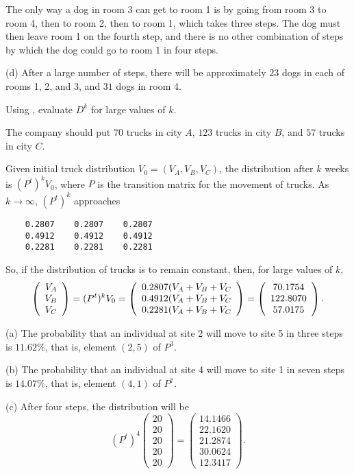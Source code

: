 \soln The only way a dog in room 3 can get to room 1
is by going from room 3 to room 4, then to room 2, then to room 1, which
takes three steps.  The dog must then leave room 1 on the fourth step,
and there is no other combination of steps by which the dog could go to
room 1 in four steps.

(d) \ans After a large number of steps, there will be approximately $23$
dogs in each of rooms 1, 2, and 3, and $31$ dogs in room 4.

\soln Using \Matlab, evaluate $D^k$ for large values of $k$.

\ans The company should put $70$ trucks in city $A$, $123$ trucks in city
$B$, and $57$ trucks in city $C$.

\soln Given initial truck distribution $V_0 = (V_A,V_B,V_C)$, the
distribution after $k$ weeks is $(P^t)^kV_0$, where $P$ is the transition
matrix for the movement of trucks.  As $k \rightarrow \infty$, $(P^t)^k$
approaches
\begin{verbatim}
    0.2807    0.2807    0.2807
    0.4912    0.4912    0.4912
    0.2281    0.2281    0.2281
\end{verbatim}
So, if the distribution of trucks is to remain constant, then, for large
values of $k$,
\[
\left(\begin{array}{r} V_A \\ V_B \\ V_C\end{array}\right) = (P^t)^kV_0 = \left(\begin{array}{c} 0.2807(V_A +
V_B + V_C \\ 0.4912(V_A + V_B + V_C \\ 0.2281(V_A + V_B + V_C\end{array}\right) =
\left(\begin{array}{c} 70.1754 \\ 122.8070 \\ 57.0175\end{array}\right).
\]

(a) The probability that an individual at site 2 will move to site 5 in
three steps is $11.62\%$, that is, element $(2,5)$ of $P^3$.

(b) The probability that an individual at site 4 will move to site 1 in
seven steps is $14.07\%$, that is, element $(4,1)$ of $P^7$.

(c) After four steps, the distribution will be
\[ (P^t)^4\left(\begin{array}{r} 20 \\ 20 \\ 20 \\ 20 \\ 20
\end{array}\right) = \left(\begin{array}{r} 14.1466 \\ 22.1620 \\
21.2874 \\ 30.0624 \\ 12.3417 \end{array}\right). \]


